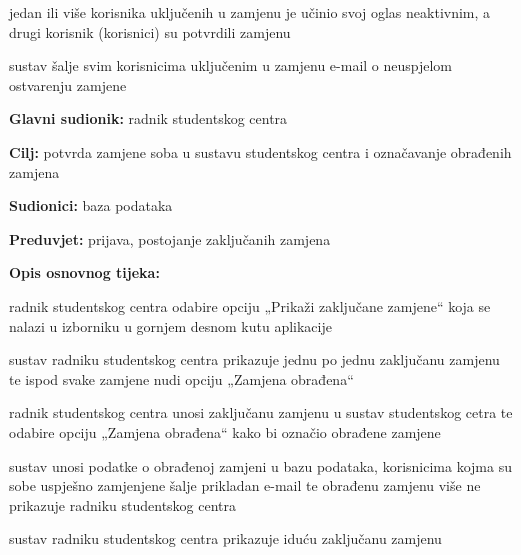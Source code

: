 \begin{packed_item}
\begin{packed_item}
\begin{packed_enum}
		\end{packed_enum}

		\item[3.b] jedan ili više korisnika uključenih u zamjenu je učinio svoj oglas neaktivnim, a drugi korisnik (korisnici) su potvrdili zamjenu
		\item[] \begin{packed_enum}
			
			\item sustav šalje svim korisnicima uključenim u zamjenu e-mail o neuspjelom ostvarenju zamjene
			
		\end{packed_enum}
		
		
	\end{packed_item}
\end{packed_item}

\noindent {}
\begin{packed_item}
	
	\item \textbf{Glavni sudionik: } radnik studentskog centra
	\item  \textbf{Cilj:}  potvrda zamjene soba u sustavu studentskog centra i označavanje obrađenih zamjena
	\item  \textbf{Sudionici:} baza podataka
	\item  \textbf{Preduvjet:}  prijava, postojanje zaključanih zamjena
	\item  \textbf{Opis osnovnog tijeka:}
	
	\item[] \begin{packed_enum}
		
		\item radnik studentskog centra odabire opciju „Prikaži zaključane zamjene“ koja se nalazi u izborniku u gornjem desnom kutu aplikacije
		\item sustav radniku studentskog centra  prikazuje jednu po jednu zaključanu zamjenu te ispod svake zamjene nudi opciju „Zamjena obrađena“
		\item radnik studentskog centra unosi zaključanu zamjenu u sustav studentskog cetra te odabire opciju „Zamjena obrađena“ kako bi označio obrađene zamjene
		\item sustav unosi podatke o obrađenoj zamjeni u bazu podataka, korisnicima kojma su sobe uspješno zamjenjene šalje prikladan e-mail te obrađenu zamjenu više ne prikazuje radniku studentskog centra
		\item sustav radniku studentskog centra prikazuje iduću zaključanu zamjenu
		
	\end{packed_enum}
	
\end{packed_item}

